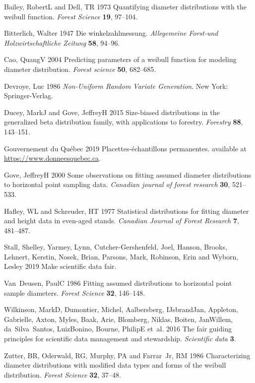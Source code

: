 \documentclass{foresj}
\begin{document}
\begin{thebibliography}

Bailey, RobertL and Dell, TR 1973 Quantifying diameter distributions with the
  weibull function.
\textit{Forest Science} \textbf{19}, 97--104.

Bitterlich, Walter 1947 Die winkelzahlmessung.
\textit{Allegemeine Forst-und Holzwirtschaftliche Zeitung} \textbf{58}, 94--96.

Cao, QuangV 2004 Predicting parameters of a weibull function for modeling
  diameter distribution.
\textit{Forest science} \textbf{50}, 682--685.

Devroye, Luc 1986 \textit{{Non-Uniform Random Variate Generation}}.
New York: {Springer-Verlag}.

Ducey, MarkJ and Gove, JeffreyH 2015 Size-biased distributions in the
  generalized beta distribution family, with applications to forestry.
\textit{Forestry} \textbf{88}, 143--151.

{Gouvernement du Québec} 2019 {Placettes-échantillons permanentes}.
available at \url{https://www.donneesquebec.ca}.

Gove, JeffreyH 2000 Some observations on fitting assumed diameter distributions
  to horizontal point sampling data.
\textit{Canadian journal of forest research} \textbf{30}, 521--533.

Hafley, WL and Schreuder, HT 1977 Statistical distributions for fitting
  diameter and height data in even-aged stands.
\textit{Canadian Journal of Forest Research} \textbf{7}, 481--487.

Stall, Shelley, Yarmey, Lynn, Cutcher-Gershenfeld, Joel, Hanson, Brooks,
  Lehnert, Kerstin, Nosek, Brian, Parsons, Mark, Robinson, Erin and Wyborn,
  Lesley 2019 Make scientific data fair.

Van~Deusen, PaulC 1986 Fitting assumed distributions to horizontal point sample
  diameters.
\textit{Forest Science} \textbf{32}, 146--148.

Wilkinson, MarkD, Dumontier, Michel, Aalbersberg, IJsbrandJan, Appleton,
  Gabrielle, Axton, Myles, Baak, Arie, Blomberg, Niklas, Boiten, JanWillem,
  da~Silva~Santos, LuizBonino, Bourne, PhilipE et~al. 2016 The fair guiding
  principles for scientific data management and stewardship.
\textit{Scientific data} \textbf{3}.

Zutter, BR, Oderwald, RG, Murphy, PA and Farrar~Jr, RM 1986 Characterizing
  diameter distributions with modified data types and forms of the weibull
  distribution.
\textit{Forest Science} \textbf{32}, 37--48.

\end{thebibliography}
\end{document}
